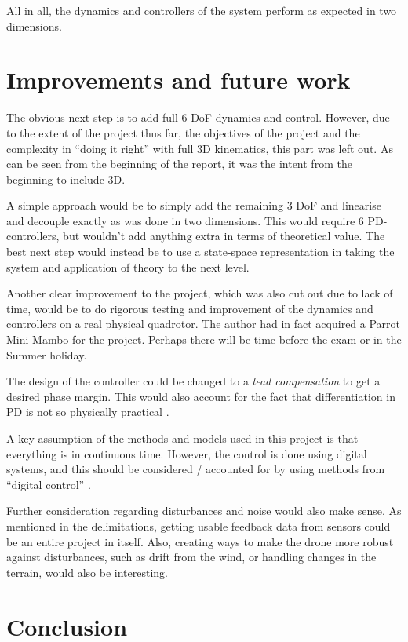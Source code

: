 \documentclass[a4paper]{report}
\begin{document}
All in all, the dynamics and controllers of the system perform as expected in two dimensions.

\newpage
\chapter{Improvements and future work}

The obvious next step is to add full 6 \gls{DoF} dynamics and control. However, due to the extent of the project thus far, the objectives of the project and the complexity in ``doing it right'' with full 3D kinematics, this part was left out. As can be seen from the beginning of the report, it was the intent from the beginning to include 3D.

A simple approach would be to simply add the remaining 3 \gls{DoF} and linearise and decouple exactly as was done in two dimensions. This would require 6 PD-controllers, but wouldn't add anything extra in terms of theoretical value. The best next step would instead be to use a state-space representation in taking the system and application of theory to the next level.

Another clear improvement to the project, which was also cut out due to lack of time, would be to do rigorous testing and improvement of the dynamics and controllers on a real physical quadrotor. The author had in fact acquired a Parrot Mini Mambo for the project. Perhaps there will be time before the exam or in the Summer holiday.

The design of the controller could be changed to a \textit{lead compensation} to get a desired phase margin. 
This would also account for the fact that differentiation in PD is not so physically practical \cite[p. 253]{franklin}.

A key assumption of the methods and models used in this project is that everything is in continuous time. However, the control is done using digital systems, and this should be considered / accounted for by using methods from ``digital control'' \cite[p. 214]{franklin}.

Further consideration regarding disturbances and noise would also make sense. As mentioned in the delimitations, getting usable feedback data from sensors could be an entire project in itself. Also, creating ways to make the drone more robust against disturbances, such as drift from the wind, or handling changes in the terrain, would also be interesting. 

\chapter{Conclusion}
\end{document}
